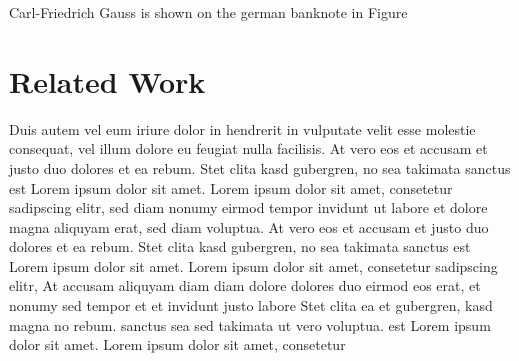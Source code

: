 \documentclass[11pt,twoside,a4paper,titlepage]{article}
\begin{document}
Carl-Friedrich Gauss is shown on the german banknote in Figure %

\section{Related Work}


Duis autem vel eum iriure dolor in hendrerit in vulputate velit esse molestie consequat, vel illum dolore eu feugiat nulla facilisis. At vero eos et accusam et justo duo dolores et ea rebum. Stet clita kasd gubergren, no sea takimata sanctus est Lorem ipsum dolor sit amet. Lorem ipsum dolor sit amet, consetetur sadipscing elitr, sed diam nonumy eirmod tempor invidunt ut labore et dolore magna aliquyam erat, sed diam voluptua. At vero eos et accusam et justo duo dolores et ea rebum. Stet clita kasd gubergren, no sea takimata sanctus est Lorem ipsum dolor sit amet. Lorem ipsum dolor sit amet, consetetur sadipscing elitr, At accusam aliquyam diam diam dolore dolores duo eirmod eos erat, et nonumy sed tempor et et invidunt justo labore Stet clita ea et gubergren, kasd magna no rebum. sanctus sea sed takimata ut vero voluptua. est Lorem ipsum dolor sit amet. Lorem ipsum dolor sit amet, consetetur\\

%
%
\end{document}
